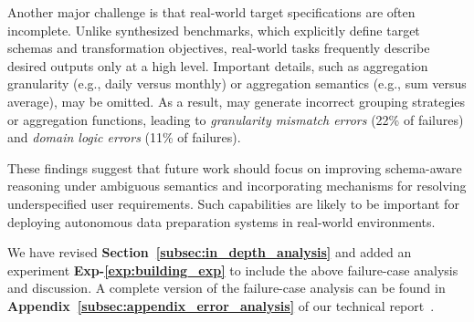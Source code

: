 Another major challenge is that real-world target specifications are often incomplete. Unlike synthesized benchmarks, which explicitly define target schemas and transformation objectives, real-world tasks frequently describe desired outputs only at a high level. Important details, such as aggregation granularity (e.g., daily versus monthly) or aggregation semantics (e.g., sum versus average), may be omitted. As a result, \sys may generate incorrect grouping strategies or aggregation functions, leading to \emph{granularity mismatch errors} (22\% of failures) and \emph{domain logic errors} (11\% of failures).


These findings suggest that future work should focus on improving schema-aware reasoning under ambiguous semantics and incorporating mechanisms for resolving underspecified user requirements. Such capabilities are likely to be important for deploying autonomous data preparation systems in real-world environments.


{We have revised \textbf{Section~\ref{subsec:in_depth_analysis}} and added an experiment \textbf{Exp-\ref{exp:building_exp}} to include the above failure-case analysis and discussion.} A complete version of the failure-case analysis can be found in \textbf{Appendix~\ref{subsec:appendix_error_analysis}} of our technical report~\cite{technical_report}.